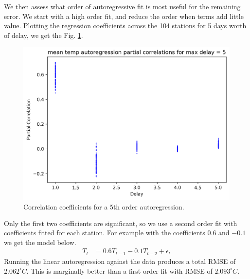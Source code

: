 \documentclass[12pt,a4paper]{article} %
\begin{document}
We then assess what order of autoregressive fit is most useful for the remaining error. We start with a high order fit, and reduce the order when terms add little value. Plotting the regression coefficients across the 104 stations for 5 days worth of delay, we get the Fig. \ref{fig:partial_corr_delay_5}.
\begin{figure}[!ht]
    \centering
    \includegraphics[width=.7\linewidth]{mean_partial_corr_by_delay_5.png}
    \caption{Correlation coefficients for a 5th order autoregression.}
    \label{fig:partial_corr_delay_5}
\end{figure}
Only the first two coefficients are significant, so we use a second order fit with coefficients fitted for each station. For example with the coefficients $0.6$ and $-0.1$ we get the model below.
\begin{align*}
    T_t&=0.6T_{t-1}-0.1T_{t-2}+\epsilon_t
\end{align*}
Running the linear autoregression against the data produces a total RMSE of $2.062^\circ C$. This is marginally better than a first order fit with RMSE of $2.093^\circ C$.\\
\end{document}
